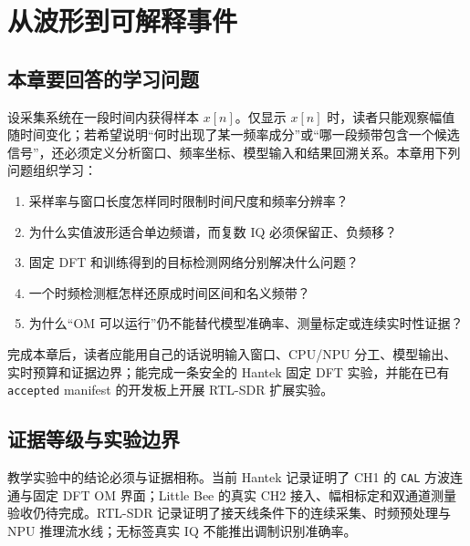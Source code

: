 \section{从波形到可解释事件}\label{src-experiment-case5-overview}

\subsection{本章要回答的学习问题}\label{src-experiment-case5-outcomes}

设采集系统在一段时间内获得样本 \(x[n]\)。仅显示 \(x[n]\)
时，读者只能观察幅值随时间变化；若希望说明``何时出现了某一频率成分''或``哪一段频带包含一个候选信号''，还必须定义分析窗口、频率坐标、模型输入和结果回溯关系。本章用下列问题组织学习：

\begin{enumerate}
\def\labelenumi{\arabic{enumi}.}
\tightlist
\item
  采样率与窗口长度怎样同时限制时间尺度和频率分辨率？
\item
  为什么实值波形适合单边频谱，而复数 IQ 必须保留正、负频移？
\item
  固定 DFT 和训练得到的目标检测网络分别解决什么问题？
\item
  一个时频检测框怎样还原成时间区间和名义频带？
\item
  为什么``OM 可以运行''仍不能替代模型准确率、测量标定或连续实时性证据？
\end{enumerate}

完成本章后，读者应能用自己的话说明输入窗口、CPU/NPU
分工、模型输出、实时预算和证据边界；能完成一条安全的 Hantek 固定 DFT
实验，并能在已有 \passthrough{\lstinline!accepted!} manifest
的开发板上开展 RTL-SDR 扩展实验。

\subsection{证据等级与实验边界}\label{src-experiment-case5-runtime-boundary}

教学实验中的结论必须与证据相称。当前 Hantek 记录证明了 CH1 的
\passthrough{\lstinline!CAL!} 方波连通与固定 DFT OM 界面；Little Bee
的真实 CH2 接入、幅相标定和双通道测量验收仍待完成。RTL-SDR
记录证明了接天线条件下的连续采集、时频预处理与 NPU
推理流水线；无标签真实 IQ 不能推出调制识别准确率。

